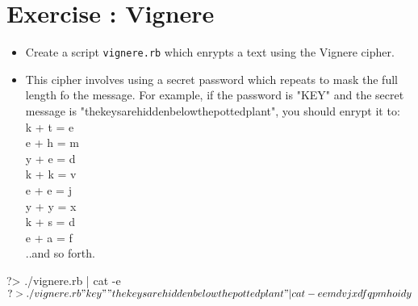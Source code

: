 \documentclass{42-en}
\begin{document}


\chapter{Exercise \exercicenumber: Vignere}

\exnumber{\exercicenumber}


\begin{itemize}

\item Create a script \texttt{vignere.rb} which enrypts a text using the Vignere cipher.
\item This cipher involves using a secret password which repeats to mask the full length fo the message. For example, if the password is "KEY" and the secret message is "thekeysarehiddenbelowthepottedplant", you should enrypt it to:
\\
k + t = e\\
e + h = m\\
y + e = d\\
k + k = v\\
e + e = j\\
y + y = x\\
k + s = d\\
e + a = f\\
..and so forth. 

\end{itemize}

\begin{42console}
	?> ./vignere.rb | cat -e
	$
	?> ./vignere.rb "key" "thekeysarehiddenbelowthepottedplant" | cat -e
	emdvjxdfqpmhoidy$
\end{42console}



\end{document}
